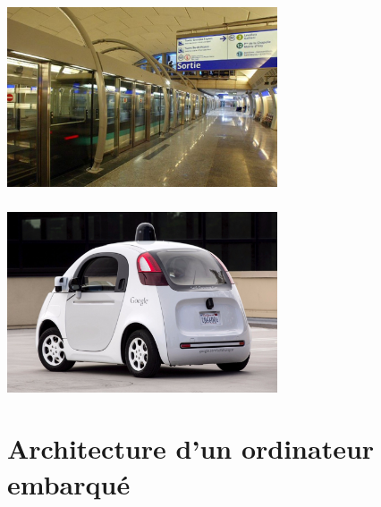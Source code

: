 \documentclass[svgnames,11pt]{beamer}
\begin{document}
\begin{frame}
    \frametitle{}

    \begin{center}
    \centering
    \includegraphics[width=8cm]{ressources/metro.jpg}
    \label{IMG}
    \end{center}

\end{frame}
\begin{frame}
    \frametitle{}

    \begin{center}
    \centering
    \includegraphics[width=8cm]{ressources/voiture.jpg}
    \label{IMG}
    \end{center}

\end{frame}
\begin{frame}
    \frametitle{}
    \begin{center}
    \end{center}
    

\end{frame}

\section{Architecture d'un ordinateur embarqué}
\end{document}
